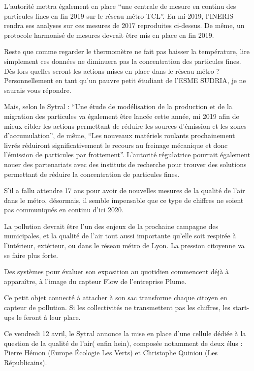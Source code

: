 \documentclass[11pt]{article}
\begin{document}
L'autorité mettra également en place ``une centrale de mesure en continu
des particules fines en fin 2019 sur le réseau métro TCL''. En mi-2019,
l'INERIS rendra ses analyses sur ces mesures de 2017 reproduites
ci-dessus. De même, un protocole harmonisé de mesures devrait être mis
en place en fin 2019.

Reste que comme regarder le thermomètre ne fait pas baisser la
température, lire simplement ces données ne diminuera pas la
concentration des particules fines. Dès lors quelles seront les actions
mises en place dans le réseau métro ?Personnellement en tant qu'un
pauvre petit étudiant de l'ESME SUDRIA, je ne saurais vous répondre.

Mais, selon le Sytral : ``Une étude de modélisation de la production et
de la migration des particules va également être lancée cette année, mi
2019 afin de mieux cibler les actions permettant de réduire les sources
d'émission et les zones d'accumulation'', de même, ``Les nouveaux
matériels roulants prochainement livrés réduiront significativement le
recours au freinage mécanique et donc l'émission de particules par
frottement''. L'autorité régulatrice pourrait également nouer des
partenariats avec des instituts de recherche pour trouver des solutions
permettant de réduire la concentration de particules fines.

S'il a fallu attendre 17 ans pour avoir de nouvelles mesures de la
qualité de l'air dans le métro, désormais, il semble impensable que ce
type de chiffres ne soient pas communiqués en continu d'ici 2020.

La pollution devrait être l'un des enjeux de la prochaine campagne des
municipales, et la qualité de l'air tout aussi importante qu'elle soit
respirée à l'intérieur, extérieur, ou dans le réseau métro de Lyon. La
pression citoyenne va se faire plus forte.

Des systèmes pour évaluer son exposition au quotidien commencent déjà à
apparaître, à l'image du capteur Flow de l'entreprise Plume.

Ce petit objet connecté à attacher à son sac transforme chaque citoyen
en capteur de pollution. Si les collectivités ne transmettent pas les
chiffres, les start-ups le feront à leur place.

Ce vendredi 12 avril, le Sytral annonce la mise en place d'une cellule
dédiée à la question de la qualité de l'air( enfin hein), composée
notamment de deux élus : Pierre Hémon (Europe Écologie Les Verts) et
Christophe Quiniou (Les Républicains).
\end{document}

